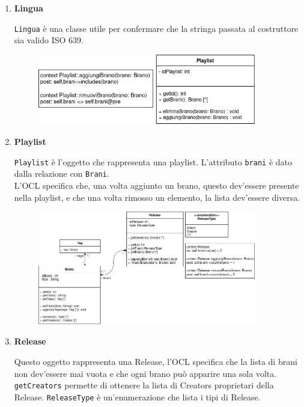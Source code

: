 \documentclass[a4paper,12pt]{article}
\begin{document}
\begin{enumerate}
    \item \label{lingua} \textbf{Lingua}

    \texttt{Lingua} è una classe utile per confermare che la stringa passata al costruttore sia valido ISO 639.

    \newpage

    \begin{figure}[htp]
        \centering
        \includegraphics[width=0.9\textwidth]{diagrams/class-playlist.png}
    \end{figure}

    \item \label{playlist} \textbf{Playlist}

    \texttt{Playlist} è l'oggetto che rappresenta una playlist. L'attributo \texttt{brani} è dato dalla relazione con \texttt{Brani}.\\
    L'OCL specifica che, una volta aggiunto un brano, questo dev'essere presente nella playlist, e che una volta rimosso un elemento, la lista dev'essere diversa.

    \begin{figure}[htp]
        \centering
        \includegraphics[width=0.9\textwidth]{diagrams/class-media.png}
    \end{figure}

    \item \label{release} \textbf{Release}

    Questo oggetto rappresenta una Release, l'OCL specifica che la lista di brani non dev'essere mai vuota e che ogni brano può apparire una sola volta.\\
    \texttt{getCreators} permette di ottenere la lista di Creators proprietari della Release.
    \texttt{ReleaseType} è un'enumerazione che lista i tipi di Release.


\end{enumerate}
\end{document}

